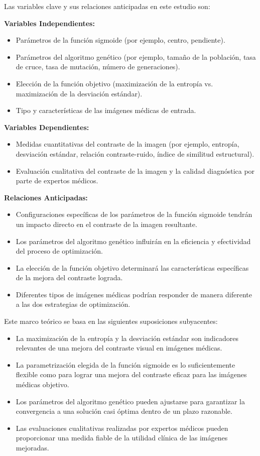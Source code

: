 Las variables clave y sus relaciones anticipadas en este estudio son:

\textbf{Variables Independientes:}
\begin{itemize}
\item Parámetros de la función sigmoide (por ejemplo, centro, pendiente).
\item Parámetros del algoritmo genético (por ejemplo, tamaño de la población, tasa de cruce, tasa de mutación, número de generaciones).
\item Elección de la función objetivo (maximización de la entropía vs. maximización de la desviación estándar).
\item Tipo y características de las imágenes médicas de entrada.
\end{itemize}

\textbf{Variables Dependientes:}
\begin{itemize}
\item Medidas cuantitativas del contraste de la imagen (por ejemplo, entropía, desviación estándar, relación contraste-ruido, índice de similitud estructural).
\item Evaluación cualitativa del contraste de la imagen y la calidad diagnóstica por parte de expertos médicos.
\end{itemize}

\textbf{Relaciones Anticipadas:}
\begin{itemize}
\item Configuraciones específicas de los parámetros de la función sigmoide tendrán un impacto directo en el contraste de la imagen resultante.
\item Los parámetros del algoritmo genético influirán en la eficiencia y efectividad del proceso de optimización.
\item La elección de la función objetivo determinará las características específicas de la mejora del contraste lograda.
\item Diferentes tipos de imágenes médicas podrían responder de manera diferente a las dos estrategias de optimización.
\end{itemize}

Este marco teórico se basa en las siguientes suposiciones subyacentes:
\begin{itemize}
\item La maximización de la entropía y la desviación estándar son indicadores relevantes de una mejora del contraste visual en imágenes médicas.
\item La parametrización elegida de la función sigmoide es lo suficientemente flexible como para lograr una mejora del contraste eficaz para las imágenes médicas objetivo.
\item Los parámetros del algoritmo genético pueden ajustarse para garantizar la convergencia a una solución casi óptima dentro de un plazo razonable.
\item Las evaluaciones cualitativas realizadas por expertos médicos pueden proporcionar una medida fiable de la utilidad clínica de las imágenes mejoradas.
\end{itemize}

